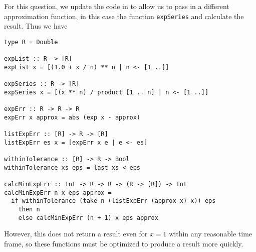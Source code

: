 
For this question, we update the code in  to allow us
to pass in a different approximation function, in this case the function \verb|expSeries|
and calculate the result. Thus we have
\begin{verbatim}
type R = Double

expList :: R -> [R]
expList x = [(1.0 + x / n) ** n | n <- [1 ..]]

expSeries :: R -> [R]
expSeries x = [(x ** n) / product [1 .. n] | n <- [1 ..]]

expErr :: R -> R -> R
expErr x approx = abs (exp x - approx)

listExpErr :: [R] -> R -> [R]
listExpErr es x = [expErr x e | e <- es]

withinTolerance :: [R] -> R -> Bool
withinTolerance xs eps = last xs < eps

calcMinExpErr :: Int -> R -> R -> (R -> [R]) -> Int
calcMinExpErr n x eps approx =
  if withinTolerance (take n (listExpErr (approx x) x)) eps
    then n
    else calcMinExpErr (n + 1) x eps approx
\end{verbatim}
However, this does not return a result even for $x = 1$ within any reasonable time frame,
so these functions must be optimized to produce a result more quickly.
